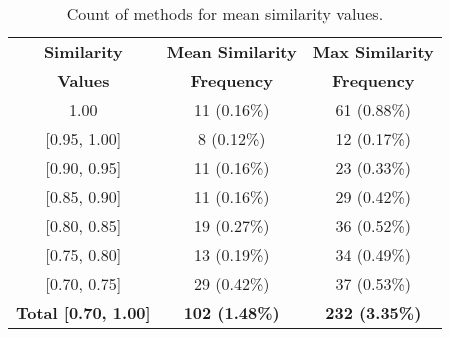 \begin{table}[]
    \centering
\caption{Count of methods for mean similarity values.} 
\begin{tabular}{c|c|c}
\toprule
\textbf{Similarity}             & \textbf{Mean Similarity} & \textbf{Max Similarity} \\
\textbf{Values}                 & \textbf{Frequency}       & \textbf{Frequency}      \\ \midrule
1.00                            & 11 (0.16\%)              & 61 (0.88\%)             \\
{[}0.95, 1.00{]}                & 8 (0.12\%)               & 12 (0.17\%)             \\
{[}0.90, 0.95{]}                & 11 (0.16\%)              & 23 (0.33\%)             \\
{[}0.85, 0.90{]}                & 11 (0.16\%)              & 29 (0.42\%)             \\
{[}0.80, 0.85{]}                & 19 (0.27\%)              & 36 (0.52\%)             \\
{[}0.75, 0.80{]}                & 13 (0.19\%)              & 34 (0.49\%)             \\
{[}0.70, 0.75{]}                & 29 (0.42\%)              & 37 (0.53\%)             \\ \midrule
\textbf{Total {[}0.70, 1.00{]}} & \textbf{102 (1.48\%)}    & \textbf{232 (3.35\%)}   \\ \bottomrule
\end{tabular}
\label{tab:count_methods_similarity}
\end{table}


